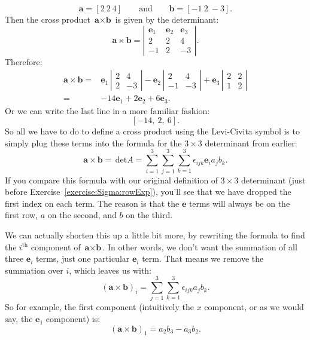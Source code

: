 \[ \textbf{a}= [2~ 2~ 4] \qquad \text{and} \qquad \textbf{b}=[-1~2~-3]. \]
Then the cross product $\textbf{a} \times \textbf{b}$ is given by the determinant:
\[ \textbf{a} \times \textbf{b} =
 \left| \begin{array}{ccc}
\textbf{e}_1 & \textbf{e}_2  & \textbf{e}_3  \\
2 & 2 & 4\\
-1 & 2 & -3 \end{array} \right|.\] 
Therefore:
\begin{align*}
\textbf{a} \times \textbf{b} =& \textbf{e}_1 \,
 \left| \begin{array}{cc}
2 & 4 \\
2 & -3  \end{array} \right| - \textbf{e}_2 \,
 \left| \begin{array}{cc}
2 & 4 \\
-1 & -3  \end{array} \right| + \textbf{e}_3 \,
 \left| \begin{array}{cc}
2 & 2 \\
1 & 2  \end{array} \right| \\
=& -14 \textbf{e}_1 + 2 \textbf{e}_2 + 6 \textbf{e}_3.
\end{align*}
Or we can write the last line in a more familiar fashion:
\[ [-14, ~ 2, ~ 6]. \] 
So all we have to do to define a cross product using the Levi-Civita symbol is to simply plug these terms into the formula for the $3 \times 3$ determinant from earlier:
\[\textbf{a} \times \textbf{b} = \,\text{det} A = \sum_{i=1}^3 \sum_{j=1}^3 \sum_{k=1}^3 \epsilon_{ijk} \textbf{e}_i  a_j b_k. \]
If you compare this formula with our original definition of $3 \times 3$ determinant (just before Exercise~\ref{exercise:Sigma:rowExp}), you'll see  that we have dropped the first index on each term.  The reason is that the $\textbf{e}$ terms will always be on the first row, $a$ on the second, and $b$ on the third.  

We can actually shorten this up a little bit more, by rewriting the formula to find the $i^{\text{th}}$ component of $\textbf{a} \times \textbf{b}$.  In other words, we don't want the summation of all three $\textbf{e}_i$ terms, just one particular $\textbf{e}_i$ term.  That means we remove the summation over $i$, which leaves us with:
\[ (\textbf{a} \times \textbf{b})_i = \sum_{j=1}^3 \sum_{k=1}^3 \epsilon_{ijk} a_j b_k. \]
So for example, the first component (intuitively the $x$ component, or as we would say, the $\textbf{e}_1$ component) is:
\[ (\textbf{a} \times \textbf{b})_1 = a_2 b_3 - a_3 b_2. \]

